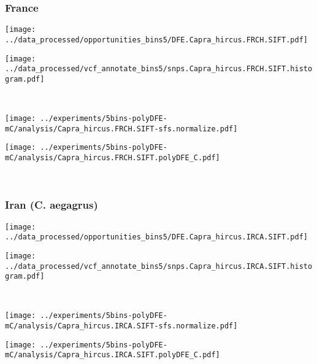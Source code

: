 \subsubsection{France}

\begin{minipage}{0.49\linewidth}
    \texttt{[image: ../data\_processed/opportunities\_bins5/DFE.Capra\_hircus.FRCH.SIFT.pdf]}
\end{minipage}
\begin{minipage}{0.49\linewidth}
    \texttt{[image: ../data\_processed/vcf\_annotate\_bins5/snps.Capra\_hircus.FRCH.SIFT.histogram.pdf]}
\end{minipage}
\\
\begin{minipage}{0.49\linewidth}
    \texttt{[image: ../experiments/5bins-polyDFE-mC/analysis/Capra\_hircus.FRCH.SIFT-sfs.normalize.pdf]}
\end{minipage}
\begin{minipage}{0.49\linewidth}
    \texttt{[image: ../experiments/5bins-polyDFE-mC/analysis/Capra\_hircus.FRCH.SIFT.polyDFE\_C.pdf]}
\end{minipage}
\\

\subsubsection{Iran (C. aegagrus)}

\begin{minipage}{0.49\linewidth}
    \texttt{[image: ../data\_processed/opportunities\_bins5/DFE.Capra\_hircus.IRCA.SIFT.pdf]}
\end{minipage}
\begin{minipage}{0.49\linewidth}
    \texttt{[image: ../data\_processed/vcf\_annotate\_bins5/snps.Capra\_hircus.IRCA.SIFT.histogram.pdf]}
\end{minipage}
\\
\begin{minipage}{0.49\linewidth}
    \texttt{[image: ../experiments/5bins-polyDFE-mC/analysis/Capra\_hircus.IRCA.SIFT-sfs.normalize.pdf]}
\end{minipage}
\begin{minipage}{0.49\linewidth}
    \texttt{[image: ../experiments/5bins-polyDFE-mC/analysis/Capra\_hircus.IRCA.SIFT.polyDFE\_C.pdf]}
\end{minipage}
\\

